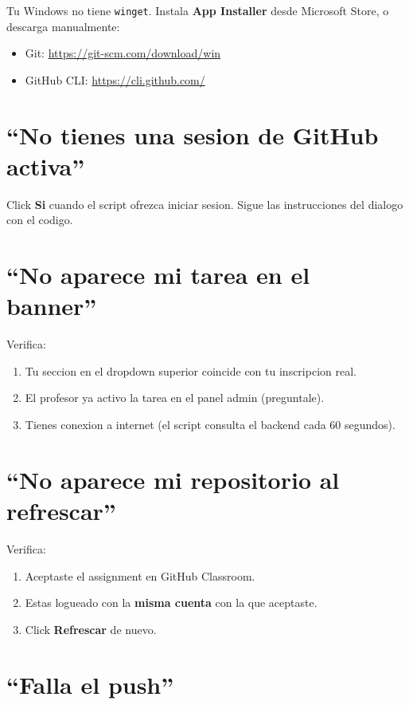 \documentclass[11pt,a4paper,oneside]{report}
\begin{document}
Tu Windows no tiene \texttt{winget}. Instala \textbf{App Installer} desde Microsoft Store, o descarga manualmente:

\begin{itemize}
  \item Git: \url{https://git-scm.com/download/win}
  \item GitHub CLI: \url{https://cli.github.com/}
\end{itemize}

\section{\textquotedblleft No tienes una sesion de GitHub activa\textquotedblright}

Click \textbf{Si} cuando el script ofrezca iniciar sesion. Sigue las instrucciones del dialogo con el codigo.

\section{\textquotedblleft No aparece mi tarea en el banner\textquotedblright}

Verifica:

\begin{enumerate}
  \item Tu seccion en el dropdown superior coincide con tu inscripcion real.
  \item El profesor ya activo la tarea en el panel admin (preguntale).
  \item Tienes conexion a internet (el script consulta el backend cada 60 segundos).
\end{enumerate}

\section{\textquotedblleft No aparece mi repositorio al refrescar\textquotedblright}

Verifica:

\begin{enumerate}
  \item Aceptaste el assignment en GitHub Classroom.
  \item Estas logueado con la \textbf{misma cuenta} con la que aceptaste.
  \item Click \textbf{Refrescar} de nuevo.
\end{enumerate}

\section{\textquotedblleft Falla el push\textquotedblright}
\end{document}
